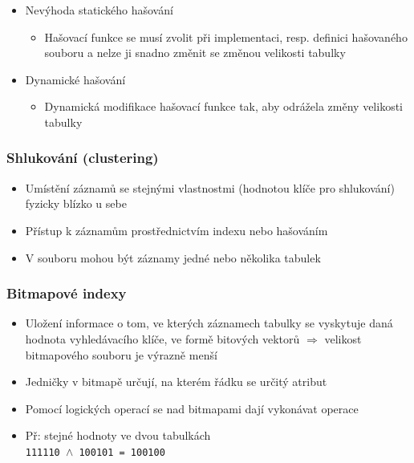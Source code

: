 \documentclass[a4paper,10pt]{article}
\newcommand{\tedy}{$\Rightarrow$ }
\begin{document}
\begin{itemize}
					\item Nevýhoda statického hašování
					\begin{itemize}
						\item Hašovací funkce se musí zvolit při implementaci, resp. definici hašovaného souboru a nelze ji snadno změnit se změnou velikosti tabulky
					\end{itemize}

					\item Dynamické hašování
					\begin{itemize}
						\item Dynamická modifikace hašovací funkce tak, aby odrážela změny velikosti tabulky
					\end{itemize}
				\end{itemize}

			\subsubsection{Shlukování (clustering)}
				\begin{itemize}
					\item Umístění záznamů se stejnými vlastnostmi (hodnotou klíče pro shlukování) fyzicky blízko u sebe
					\item Přístup k záznamům prostřednictvím indexu nebo hašováním
					\item V souboru mohou být záznamy jedné nebo několika tabulek
				\end{itemize} 
			\subsubsection{Bitmapové indexy}
				\begin{itemize}
					\item Uložení informace o tom, ve kterých záznamech tabulky se vyskytuje daná hodnota vyhledávacího klíče, ve formě bitových vektorů \tedy velikost bitmapového souboru je výrazně menší
					\item Jedničky v bitmapě určují, na kterém řádku se určitý atribut
					\item Pomocí logických operací se nad bitmapami dají vykonávat operace
					\item Př: stejné hodnoty ve dvou tabulkách \\
					\texttt{111110 $\land$ 100101 = 100100}
				\end{itemize}
\end{document}
